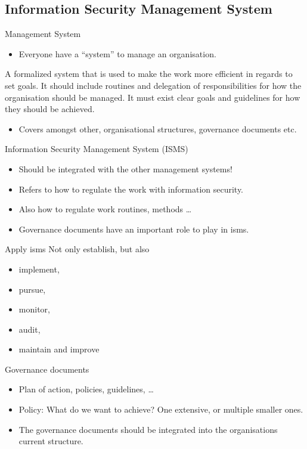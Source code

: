 \documentclass{beamer}
\begin{document}
\subsection{Information Security Management System}
\begin{frame}{Management System}
  \begin{itemize}
    \item Everyone have a \enquote{system} to manage an organisation.
  \end{itemize}
      A formalized system that is used to make the work more efficient in
      regards to set goals. It should include routines and delegation of
      responsibilities for how the organisation should be managed. It must exist
      clear goals and guidelines for how they should be achieved.
  \begin{itemize}
    \item Covers amongst other, organisational structures, governance documents
      etc.
  \end{itemize}
\end{frame}

\begin{frame}{Information Security Management System (ISMS)}
  \begin{itemize}
    \item Should be integrated with the other management systems!
    \item Refers to how to regulate the work with information security.
    \item Also how to regulate work routines, methods \dots
    \item Governance documents have an important role to play in \ac{isms}\@.
  \end{itemize}
\end{frame}

\begin{frame}{Apply \ac{isms}}
  Not only establish, but also
  \begin{itemize}
    \item implement,
    \item pursue,
    \item monitor,
    \item audit,
    \item maintain and improve
  \end{itemize}
\end{frame}

\begin{frame}{Governance documents}
  \begin{itemize}
    \item Plan of action, policies, guidelines, \dots
    \item Policy: What do we want to achieve?
      One extensive, or multiple smaller ones.
    \item The governance documents should be integrated into the organisations
      current structure.
  \end{itemize}
\end{frame}
\end{document}
